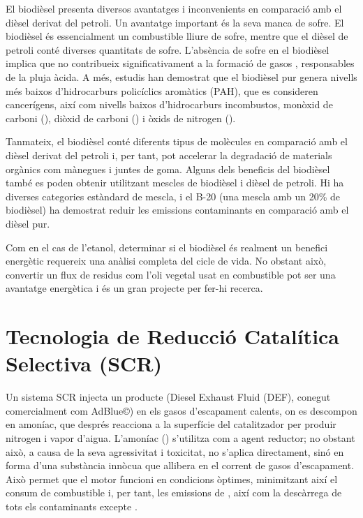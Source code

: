 El biodièsel presenta diversos avantatges i inconvenients en comparació amb el dièsel derivat del petroli. Un avantatge important és la seva manca de sofre. El biodièsel és essencialment un combustible lliure de sofre, mentre que el dièsel de petroli conté diverses quantitats de sofre. L'absència de sofre en el biodièsel implica que no contribueix significativament a la formació de gasos , responsables de la pluja àcida. A més, estudis han demostrat que el biodièsel pur genera nivells més baixos d'hidrocarburs policíclics aromàtics (PAH), que es consideren cancerígens, així com nivells baixos d'hidrocarburs incombustos, monòxid de carboni (), diòxid de carboni () i òxids de nitrogen ().

Tanmateix, el biodièsel conté diferents tipus de molècules en comparació amb el dièsel derivat del petroli i, per tant, pot accelerar la degradació de materials orgànics com mànegues i juntes de goma. Alguns dels beneficis del biodièsel també es poden obtenir utilitzant mescles de biodièsel i dièsel de petroli. Hi ha diverses categories estàndard de mescla, i el B-20 (una mescla amb un 20\% de biodièsel) ha demostrat reduir les emissions contaminants en comparació amb el dièsel pur.

Com en el cas de l'etanol, determinar si el biodièsel és realment un benefici energètic requereix una anàlisi completa del cicle de vida. No obstant això, convertir un flux de residus com l'oli vegetal usat en combustible pot ser una avantatge energètica i és un gran projecte per fer-hi recerca.


\section{Tecnologia de Reducció Catalítica Selectiva (SCR)}

Un sistema SCR injecta un producte (Diesel Exhaust Fluid (DEF), conegut comercialment com AdBlue\copyright) en els gasos d'escapament calents, on es descompon en amoníac, que després reacciona a la superfície del catalitzador per produir nitrogen i vapor d'aigua.
L'amoníac () s'utilitza com a agent reductor; no obstant això, a causa de la seva agressivitat i toxicitat, no s'aplica directament, sinó en forma d'una substància innòcua que allibera  en el corrent de gasos d'escapament. Això permet que el motor funcioni en condicions òptimes, minimitzant així el consum de combustible i, per tant, les emissions de , així com la descàrrega de tots els contaminants excepte .

